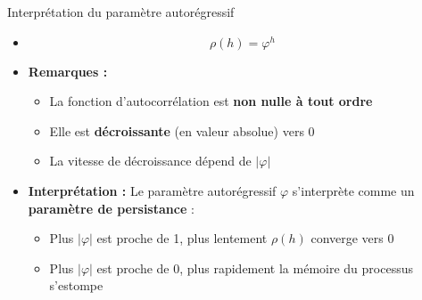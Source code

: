 \documentclass[11pt,aspectratio=169]{beamer}
\begin{document}
\begin{frame}{Interprétation du paramètre autorégressif}

\begin{itemize}

\item \[
\rho(h) = \varphi^h
\]

\item \textbf{Remarques :}
\begin{itemize}
\item La fonction d'autocorrélation est \textbf{non nulle à tout ordre}
\item Elle est \textbf{décroissante} (en valeur absolue) vers 0
\item La vitesse de décroissance dépend de $|\varphi|$
\end{itemize}

\item \textbf{Interprétation :}
Le paramètre autorégressif $\varphi$ s'interprète comme un \textbf{paramètre de persistance} :
\begin{itemize}
\item Plus $|\varphi|$ est proche de 1, plus lentement $\rho(h)$ converge vers 0
\item Plus $|\varphi|$ est proche de 0, plus rapidement la mémoire du processus s'estompe
\end{itemize}

\end{itemize}
\end{frame}
\end{document}
